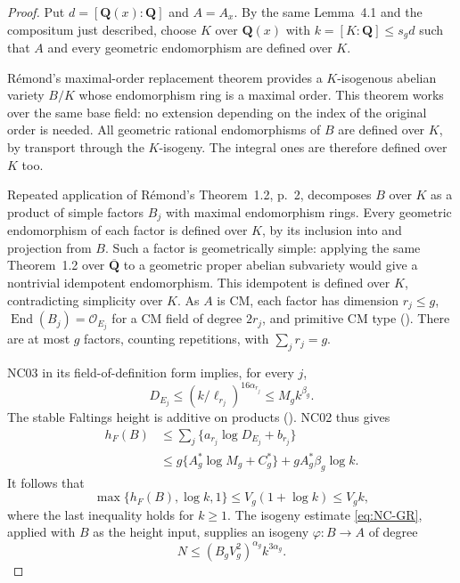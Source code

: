 \documentclass[11pt]{article}
\theoremstyle{remark}
\begin{document}
\begin{proof}
Put $d=[\mathbf Q(x):\mathbf Q]$ and $A=A_x$.
By the same Lemma~4.1 and the compositum just described,
choose $K$ over $\mathbf Q(x)$ with
$k=[K:\mathbf Q]\leq s_gd$ such that $A$ and every geometric
endomorphism are defined over $K$.

R\'emond's maximal-order replacement theorem
\cite[Theorem~1.1, pp.~1--2 of the author preprint]{NC-Remond2017}
provides a $K$-isogenous abelian variety $B/K$ whose endomorphism
ring is a maximal order.  This theorem works over the same base
field: no extension depending on the index of the original order
is needed.  All geometric rational endomorphisms of $B$ are defined
over $K$, by transport through the $K$-isogeny.  The integral ones
are therefore defined over $K$ too.

Repeated application of R\'emond's Theorem~1.2, p.~2, decomposes
$B$ over $K$ as a product of simple factors $B_j$ with maximal
endomorphism rings.  Every geometric endomorphism of each factor is defined over $K$,
by its inclusion into and projection from $B$.  Such a factor is
geometrically simple: applying the same Theorem~1.2 over
$\overline{\mathbf Q}$ to a geometric proper abelian subvariety
would give a nontrivial idempotent endomorphism.  This idempotent
is defined over $K$, contradicting simplicity over $K$.
As $A$ is CM, each factor has dimension $r_j\leq g$,
$\operatorname{End}(B_j)=\mathcal O_{E_j}$ for a CM field of degree
$2r_j$, and primitive CM type (\cite[\S7, paragraph preceding Lemma~7.5,
pp.~17--18 of the preprint]{NC-Remond2017}).  There are at most $g$ factors,
counting repetitions, with $\sum_jr_j=g$.

NC03 in its field-of-definition form implies, for every $j$,
\[
 D_{E_j}\leq(k/\ell_{r_j})^{16\alpha_{r_j}}
          \leq M_g k^{\beta_g}.
\]
The stable Faltings height is additive on products
(\cite[\S2.3, p.~352]{NC-GRPeriods2014}).  NC02 thus gives
\begin{align*}
 h_F(B)&\leq\sum_j\{a_{r_j}\log D_{E_j}+b_{r_j}\}\\
 &\leq g\{A_g^*\log M_g+C_g^*\}
          +gA_g^*\beta_g\log k.
\end{align*}
It follows that
\[
 \max\{h_F(B),\log k,1\}
 \leq V_g(1+\log k)\leq V_gk,
\]
where the last inequality holds for $k\geq1$.
The isogeny estimate \eqref{eq:NC-GR}, applied with $B$ as the
height input, supplies an isogeny $\varphi:B\to A$ of degree
\begin{equation}\label{eq:NC04-degree}
 N\leq(B_gV_g^2)^{\alpha_g}k^{3\alpha_g}.
\end{equation}


\end{proof}
\end{document}
